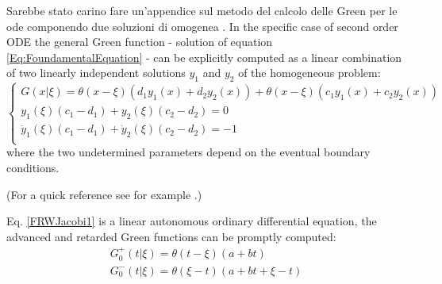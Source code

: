 \documentclass[Main]{subfiles}
\begin{document}
\ifToninus
	\begin{Warning}
		Sarebbe stato carino fare un'appendice sul metodo del calcolo delle Green per le ode componendo due soluzioni di omogenea \cite{Tornberg}.
		In the specific case of second order ODE the general Green function  - solution of equation \ref{Eq:FoundamentalEquation} - can be explicitly computed as a linear combination of two linearly independent solutions $y_1$ and $y_2$ of the homogeneous problem:
			\begin{equation}
			\begin{cases}
                        G( x \vert \xi) = \theta( x - \xi) \left(d_1 y_1(x) + d_2 y_2(x) \right) + \theta( x - \xi) \left(c_1 y_1(x) + c_2 y_2(x) \right) \\
						y_1(\xi) (c_1-d_1) + y_2(\xi) ( c_2 - d_2) = 0 \\
						\dot{y}_1(\xi) (c_1-d_1) + \dot{y}_2(\xi) ( c_2 - d_2) = -1 \\
            \end{cases}
			\end{equation}
			where the two undetermined parameters depend on the eventual boundary conditions.
		
			(For a quick reference see for example \cite{Tornberg}.)
			
			 Eq. \ref{FRWJacobi1} is a linear autonomous ordinary differential equation, the advanced and retarded Green functions can be promptly computed:
			\begin{eqnarray}\label{SimpleGreenFunction}
				G^+_0(t \vert \xi) = \theta(t-\xi) \left(a +b t \right) \nonumber\\
				G^-_0( t \vert \xi) = \theta(\xi -t) \left( a +b t + \xi -t\right) 
			\end{eqnarray}
	\end{Warning}
\fi
\end{document}
